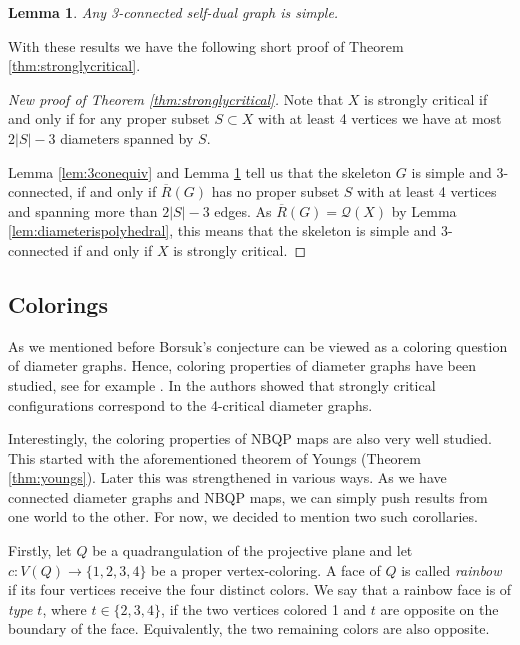 \documentclass[10pt,a4paper]{article}
\newtheorem{lemma}[theorem]{Lemma}
\newcounter{example}
\newcommand{\qt}{\mathcal{Q}}
\begin{document}
\begin{lemma}\label{lem:selfdualsimple}
    Any 3-connected self-dual graph is simple. 
\end{lemma}

With these results we have the following short proof of Theorem \ref{thm:stronglycritical}.

\begin{proof}[New proof of Theorem \ref{thm:stronglycritical}]
Note that  $X$ is strongly critical if and only if for any proper subset $S\subset X$ with at least 4 vertices we have at most $2|S|-3$ diameters spanned by $S$.

Lemma \ref{lem:3conequiv} and Lemma \ref{lem:selfdualsimple} tell us that the skeleton $G$ is simple and 3-connected, if and only if $\overline R(G)$ has no proper subset $S$ with at least 4 vertices and spanning more than  $2|S|-3$ edges. As $\overline R(G)=\qt(X)$ by Lemma \ref{lem:diameterispolyhedral}, this means that the skeleton is simple and 3-connected if and only if $X$ is strongly critical.
    
\end{proof}



 




\subsection{Colorings}
As we mentioned before Borsuk's conjecture can be viewed as a coloring question of diameter graphs. Hence, coloring properties of diameter graphs have been studied, see for example \cite{hujter2014multiple}. In \cite{lopez2023borsuk} the authors showed that strongly critical configurations correspond to the 4-critical diameter graphs. 

Interestingly, the coloring properties of NBQP maps are also very well studied. This started with the aforementioned theorem of Youngs (Theorem \ref{thm:youngs}). Later this was strengthened in various ways. As we have connected diameter graphs and NBQP maps, we can simply push results from one world to the other. For now, we decided to mention two such corollaries.  

Firstly, let $Q$ be a quadrangulation of the projective plane and let $c:V(Q)\rightarrow\{1,2,3,4\}$ be a proper vertex-coloring. A face of $Q$ is called \emph{rainbow} if its four vertices receive the four distinct colors. We say that a rainbow face is of \emph{type $t$}, where
$t\in\{2,3,4\}$, if the two vertices colored 1 and $t$ are opposite on the boundary of the face. Equivalently, the two remaining colors are also opposite.
\end{document}

